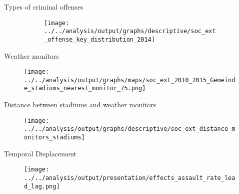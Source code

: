 \documentclass[usenames,dvipsnames]{beamer} %
\begin{document}
\label{CRIMINAL_OFFENSE_CODES}
\begin{frame}{Types of criminal offenses}
\hyperlink{CRIME_DATA}{}
\begin{figure}
	\begin{figure}
		\texttt{[image: ../../analysis/output/graphs/descriptive/soc\_ext\_offense\_key\_distribution\_2014]}
	\end{figure}
\end{figure}
\end{frame}

\begin{frame}{Weather monitors}\label{link_map_stadiums}
\hyperlink{link_weather_data}{}
\begin{figure}
	\texttt{[image: ../../analysis/output/graphs/maps/soc\_ext\_2010\_2015\_Gemeinde\_stadiums\_nearest\_monitor\_75.png]}
\end{figure}
\end{frame}

\begin{frame}{Distance between stadiums and weather monitors}\label{link_hist_dist_monitor_stadiums}
\hyperlink{link_weather_data}{}
\begin{figure}
\texttt{[image: ../../analysis/output/graphs/descriptive/soc\_ext\_distance\_monitors\_stadiums]}
\end{figure}
\end{frame}



\begin{frame}{Temporal Displacement}
\begin{figure}
	\texttt{[image: ../../analysis/output/presentation/effects\_assault\_rate\_lead\_lag.png]}
\end{figure}
\end{frame}
\end{document}
